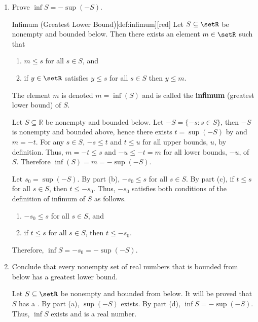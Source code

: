 \begin{enumerate}
\begin{enumerate}
    \item Prove $\inf S=-\sup (-S)$.
    \begin{define}{Infimum (Greatest Lower Bound)}[def:infimum][red]
      Let $S\subseteq\setR$ be nonempty and bounded below.
      Then there exists an element $m\in\setR$ such that
      \begin{enumerate}
        \item $m\le s$ for all $s\in S$, and
        \item if $y\in\setR$ satisfies $y\le s$ for all $s\in S$ then $y\le m$.
      \end{enumerate}
      The element $m$ is denoted $m=\inf(S)$ and is called the \textbf{infimum} (greatest lower bound) of $S$.
        \begin{subprove}
          Let $S\subseteq\mathbb R$ be nonempty and bounded below. 
          Let $-S=\{-s:s\in S\}$, then $-S$ is nonempty and bounded above, 
          hence there exists $t=\sup(-S)$ by  and $m=-t$. \proofstep
          For any $s\in S$, $-s\le t$ and $t \le u$ for all upper bounds, $u$, by definition. 
          Thus, $m=-t\le s$ and $-u\le -t=m$ for all lower bounds, $-u$, of $S$. \proofstep      
          Therefore $\inf(S)=m=-\sup(-S)$.
        \end{subprove}
    \end{define}
    \begin{subprove}
      Let $s_0 = \sup(-S)$.
      By part (b), $-s_0 \leq s$ for all $s \in S$.
      By part (c), if $t \leq s$ for all $s \in S$, then $t \leq -s_0$.
      Thus, $-s_0$ satisfies both conditions of the definition of infimum of $S$ as follows.
      \begin{enumerate}
        \item $-s_0 \leq s$ for all $s \in S$, and
        \item if $t \leq s$ for all $s \in S$, then $t \leq -s_0$.
      \end{enumerate}
      Therefore, $\inf S = -s_0 = -\sup(-S)$.
    \end{subprove}
    \item \label{prob:3e-greatest-lower-bound} Conclude that every nonempty set of real numbers that is bounded from below has a greatest lower bound.
    \begin{subprove}
      Let $S \subseteq \setR$ be nonempty and bounded from below.
      It will be proved that $S$ has a .
      By part (a), $\sup(-S)$ exists.
      By part (d), $\inf S = -\sup(-S)$.
      Thus, $\inf S$ exists and is a real number.
      

\end{subprove}
\end{enumerate}
\end{enumerate}
